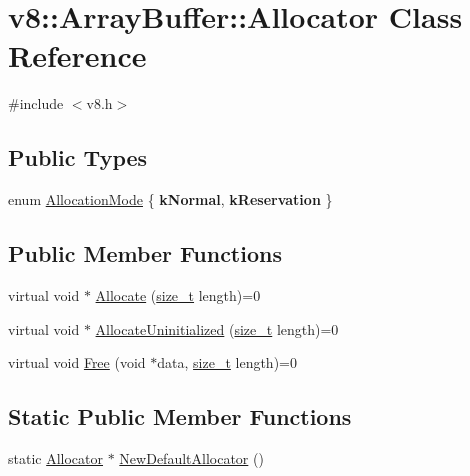 \hypertarget{classv8_1_1ArrayBuffer_1_1Allocator}{}\section{v8\+:\+:Array\+Buffer\+:\+:Allocator Class Reference}
\label{classv8_1_1ArrayBuffer_1_1Allocator}


{\ttfamily \#include $<$v8.\+h$>$}

\subsection*{Public Types}
\begin{DoxyCompactItemize}
\item 
enum \mbox{\hyperlink{classv8_1_1ArrayBuffer_1_1Allocator_ab106d1fbad7be9f6fd8b0f5c550ac59e}{Allocation\+Mode}} \{ {\bfseries k\+Normal}, 
{\bfseries k\+Reservation}
 \}
\end{DoxyCompactItemize}
\subsection*{Public Member Functions}
\begin{DoxyCompactItemize}
\item 
virtual void $\ast$ \mbox{\hyperlink{classv8_1_1ArrayBuffer_1_1Allocator_a106b0d80120ed04fe9b9675e96f0340b}{Allocate}} (\mbox{\hyperlink{classsize__t}{size\+\_\+t}} length)=0
\item 
virtual void $\ast$ \mbox{\hyperlink{classv8_1_1ArrayBuffer_1_1Allocator_a92b2d5c0a826d3c435e12f3ee178f37a}{Allocate\+Uninitialized}} (\mbox{\hyperlink{classsize__t}{size\+\_\+t}} length)=0
\item 
virtual void \mbox{\hyperlink{classv8_1_1ArrayBuffer_1_1Allocator_a419f59d2a103a5a8863809d7977c9cd8}{Free}} (void $\ast$data, \mbox{\hyperlink{classsize__t}{size\+\_\+t}} length)=0
\end{DoxyCompactItemize}
\subsection*{Static Public Member Functions}
\begin{DoxyCompactItemize}
\item 
static \mbox{\hyperlink{classv8_1_1ArrayBuffer_1_1Allocator}{Allocator}} $\ast$ \mbox{\hyperlink{classv8_1_1ArrayBuffer_1_1Allocator_a2c95b1213b0a0a2996e1c63194fc6951}{New\+Default\+Allocator}} ()
\end{DoxyCompactItemize}


